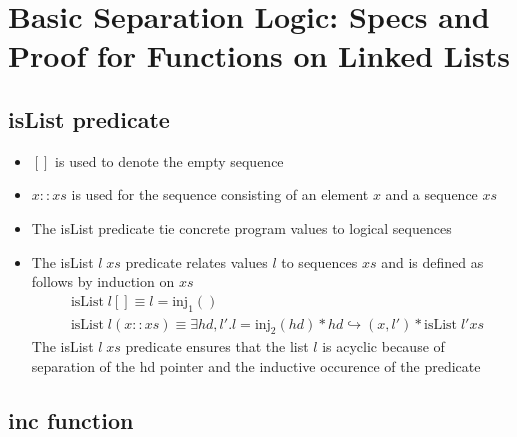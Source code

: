 \section{Basic Separation Logic: Specs and Proof for Functions on Linked Lists}

\subsection{isList predicate}
\begin{itemize}
  \item $[]$ is used to denote the empty sequence
  \item $x :: xs$ is used for the sequence consisting of an element $x$ and a sequence $xs$ 
  \item The isList predicate tie concrete program values to logical sequences
	\item The isList $l \; xs$ predicate relates values $l$ to sequences $xs$ and is defined as follows by induction on $xs$
  \begin{align*}
    & \text{isList} \; l [] \equiv l = \text{inj}_1() \\
    & \text{isList} \; l(x :: xs) \equiv \exists hd, l'.l = \text{inj}_2(hd) * hd \hookrightarrow (x, l') * \text{isList} \; l' xs
  \end{align*}
  The isList $l \; xs$ predicate ensures that the list $l$ is acyclic because of separation of the hd pointer and the inductive occurence of the predicate 
\end{itemize}

\subsection{inc function}

